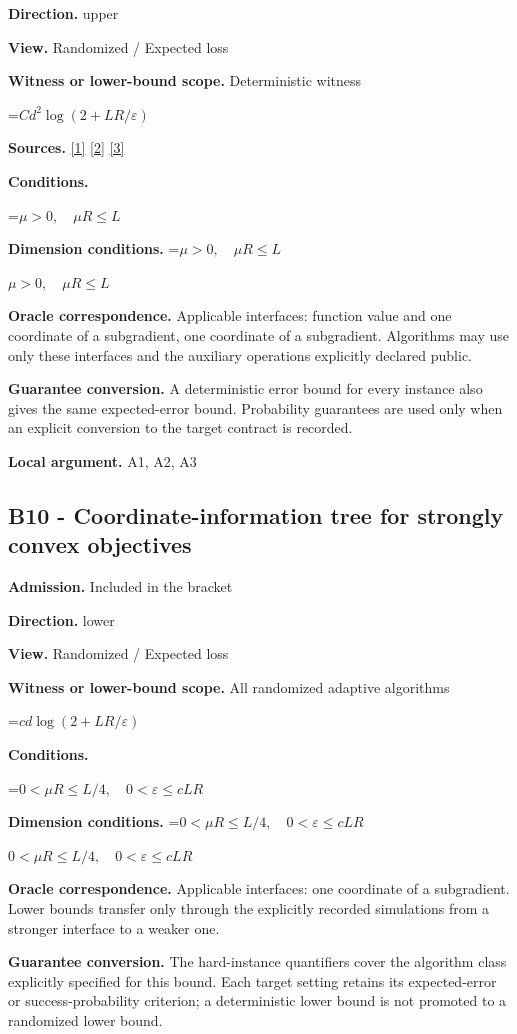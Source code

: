 \documentclass[10pt,a4paper]{article}
\newcommand{\AtlasMath}[1]{\par\begingroup\centering\setbox0=\hbox{$\displaystyle #1$}\ifdim\wd0>1.4\linewidth\typeout{ATLAS WIDE FORMULA: \the\wd0}\fi\ifdim\wd0>\linewidth\resizebox{\linewidth}{!}{\box0}\else\box0\fi\par\endgroup}
\newcommand{\AtlasInlineMath}[1]{\begingroup\setbox0=\hbox{$#1$}\ifdim\wd0>.4\linewidth\endgroup\AtlasMath{#1}\else\endgroup$#1$\fi}
\begin{document}
\textbf{Direction.} upper

\textbf{View.} Randomized / Expected loss

\textbf{Witness or lower-bound scope.} Deterministic witness

\AtlasMath{Cd^2\log(2+LR/\varepsilon)}
\textbf{Sources.} \href{https://arxiv.org/pdf/1405.4980}{[1]} \href{https://www2.isye.gatech.edu/~nemirovs/MOR_AccuracyCertificates.pdf}{[2]} \href{https://arxiv.org/pdf/2609.20701}{[3]}

\textbf{Conditions.} 
\AtlasMath{\mu>0,\quad\mu R\le L}


\textbf{Dimension conditions.} \AtlasInlineMath{\mu>0,\quad\mu R\le L}

\textbf{Oracle correspondence.} Applicable interfaces: function value and one coordinate of a subgradient, one coordinate of a subgradient. Algorithms may use only these interfaces and the auxiliary operations explicitly declared public.

\textbf{Guarantee conversion.} A deterministic error bound for every instance also gives the same expected-error bound. Probability guarantees are used only when an explicit conversion to the target contract is recorded.

\textbf{Local argument.} A1, A2, A3

\subsection{B10 - Coordinate-information tree for strongly convex objectives}
\textbf{Admission.} Included in the bracket

\textbf{Direction.} lower

\textbf{View.} Randomized / Expected loss

\textbf{Witness or lower-bound scope.} All randomized adaptive algorithms

\AtlasMath{cd\log(2+LR/\varepsilon)}
\textbf{Conditions.} 
\AtlasMath{0<\mu R\le L/4,\quad0<\varepsilon\le cLR}


\textbf{Dimension conditions.} \AtlasInlineMath{0<\mu R\le L/4,\quad0<\varepsilon\le cLR}

\textbf{Oracle correspondence.} Applicable interfaces: one coordinate of a subgradient. Lower bounds transfer only through the explicitly recorded simulations from a stronger interface to a weaker one.

\textbf{Guarantee conversion.} The hard-instance quantifiers cover the algorithm class explicitly specified for this bound. Each target setting retains its expected-error or success-probability criterion; a deterministic lower bound is not promoted to a randomized lower bound.
\end{document}
